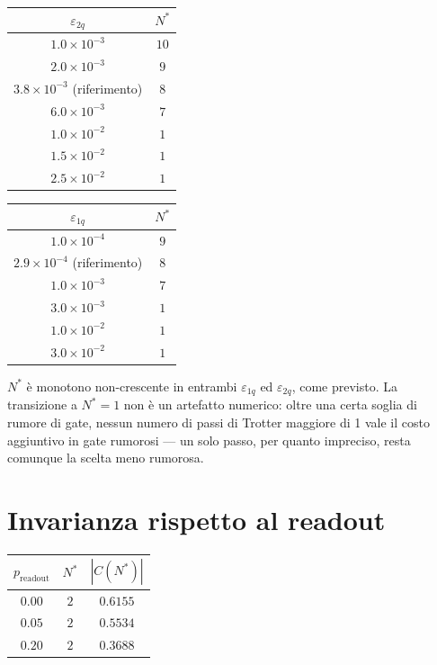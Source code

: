 \documentclass[11pt,a4paper]{article}
\begin{document}
\FloatBarrier

\begin{center}
\renewcommand{\arraystretch}{1.15}
\small
\begin{tabular}{@{}cc@{}}
\toprule
$\varepsilon_{2q}$ & $N^*$\\
\midrule
$1.0\times10^{-3}$ & $10$\\
$2.0\times10^{-3}$ & $9$\\
$3.8\times10^{-3}$ (riferimento) & $8$\\
$6.0\times10^{-3}$ & $7$\\
$1.0\times10^{-2}$ & $1$\\
$1.5\times10^{-2}$ & $1$\\
$2.5\times10^{-2}$ & $1$\\
\bottomrule
\end{tabular}
\qquad
\begin{tabular}{@{}cc@{}}
\toprule
$\varepsilon_{1q}$ & $N^*$\\
\midrule
$1.0\times10^{-4}$ & $9$\\
$2.9\times10^{-4}$ (riferimento) & $8$\\
$1.0\times10^{-3}$ & $7$\\
$3.0\times10^{-3}$ & $1$\\
$1.0\times10^{-2}$ & $1$\\
$3.0\times10^{-2}$ & $1$\\
\bottomrule
\end{tabular}
\end{center}

$N^*$ è monotono non-crescente in entrambi $\varepsilon_{1q}$ ed
$\varepsilon_{2q}$, come previsto. La transizione a $N^*=1$ non è un
artefatto numerico: oltre una certa soglia di rumore di gate, nessun numero di
passi di Trotter maggiore di 1 vale il costo aggiuntivo in gate rumorosi ---
un solo passo, per quanto impreciso, resta comunque la scelta meno rumorosa.

\section{Invarianza rispetto al readout}

\begin{center}
\renewcommand{\arraystretch}{1.2}
\begin{tabular}{@{}ccc@{}}
\toprule
$p_\text{readout}$ & $N^*$ & $|C(N^*)|$\\
\midrule
$0.00$ & $2$ & $0.6155$\\
$0.05$ & $2$ & $0.5534$\\
$0.20$ & $2$ & $0.3688$\\
\bottomrule
\end{tabular}
\end{center}
\end{document}
